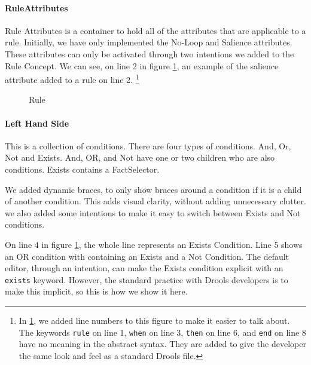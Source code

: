 \paragraph{RuleAttributes} Rule Attributes is a container to hold all of the attributes that are applicable to a rule.
Initially, we have only implemented the No-Loop and Salience attributes.
These attributes can only be activated through two intentions we added to the Rule Concept.
We can see, on line 2 in figure \ref{fig:Rule}, an example of the salience attribute added to a rule on line 2.
\footnote{In \ref{fig:Rule}, we added line numbers to this figure to make it easier to talk about.
The keywords \texttt{rule} on line 1, \texttt{when} on line 3, \texttt{then} on line 6, and \texttt{end} on line 8 have no meaning in the abstract syntax.
They are added to give the developer the same look and feel as a standard Drools file.}

\begin{figure}[h]
    \centering
    \caption{Rule}
    \label{fig:Rule}
\end{figure}

\paragraph{Left Hand Side} This is a collection of conditions.
There are four types of conditions.
And, Or, Not and Exists.
And, OR, and Not have one or two children who are also conditions.
Exists contains a FactSelector.

We added dynamic braces, to only show braces around a condition if it is a child of another condition.
This adds visual clarity, without adding unnecessary clutter.
we also added some intentions to make it easy to switch between Exists and Not conditions.

On line 4 in figure \ref{fig:Rule}, the whole line represents an Exists Condition.
Line 5 shows an OR condition with containing an Exists and a Not Condition.
The default editor, through an intention, can make the Exists condition explicit with an \texttt{exists} keyword.
However, the standard practice with Drools developers is to make this implicit, so this is how we show it here.

